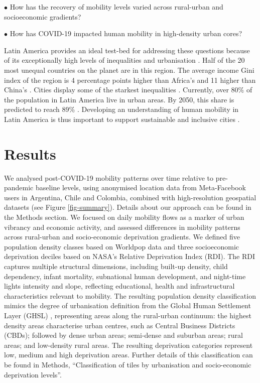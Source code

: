 \documentclass[fleqn,10pt]{wlscirep}
\begin{document}
$\bullet$ How has the recovery of mobility levels varied across rural-urban and socioeconomic gradients?

$\bullet$ How has COVID-19 impacted human mobility in high-density urban cores?

Latin America provides an ideal test-bed for addressing these questions because of its exceptionally high levels of inequalities \cite{de2004inequality, carranza2023wealth} and urbanisation \cite{united2023world}. Half of the 20 most unequal countries on the planet are in this region. The average income Gini index of the region is 4 percentage points higher than Africa's and 11 higher than China's \cite{milanovic2016global}. Cities display some of the starkest inequalities \cite{habitat2022world, bloomberg2025transit}. Currently, over 80\% of the population in Latin America live in urban areas. By 2050, this share is predicted to reach 89\% \cite{habitat2022world}. Developing an understanding of human mobility in Latin America is thus important to support sustainable and inclusive cities \cite{habitat2022world}.


\section*{Results}

We analysed post-COVID-19 mobility patterns over time relative to pre-pandemic baseline levels, using anonymised location data from Meta-Facebook users in Argentina, Chile and Colombia, combined with high-resolution geospatial datasets (see Figure \ref{fig-summary}). Details about our approach can be found in the Methods section. We focused on daily mobility flows as a marker of urban vibrancy and economic activity, and assessed differences in mobility patterns across rural-urban and socio-economic deprivation gradients. We defined five population density classes based on Worldpop data and three socioeconomic deprivation deciles based on NASA's Relative Deprivation Index (RDI). The RDI captures multiple structural dimensions, including built-up density, child dependency, infant mortality, subnational human development, and night-time lights intensity and slope, reflecting educational, health and infrastructural characteristics relevant to mobility. The resulting population density classification mimics the degree of urbanisation definition from the Global Human Settlement Layer (GHSL) \cite{pesaresi2016ghsl}, representing areas along the rural-urban continuum: the highest density areas characterise urban centres, such as Central Business Districts (CBDs); followed by dense urban areas; semi-dense and suburban areas; rural areas; and low-density rural areas. The resulting deprivation categories represent low, medium and high deprivation areas. Further details of this classification can be found in Methods, ``Classification of tiles by urbanisation and socio-economic deprivation levels''.
\end{document}
